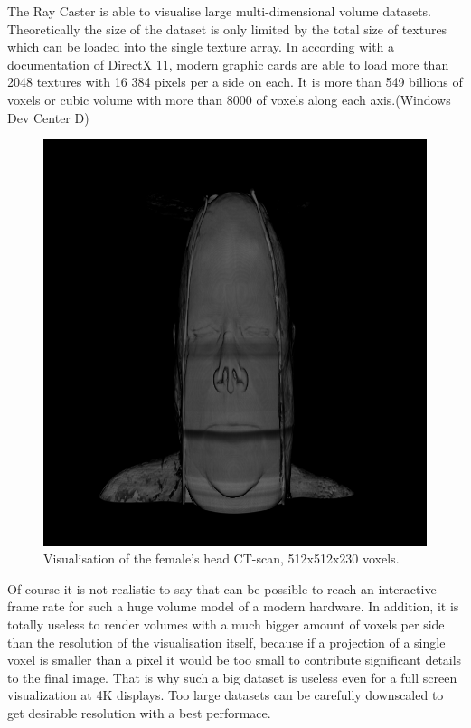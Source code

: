 \documentclass[twoside, english, 11pt]{report}
\begin{document}
The Ray Caster is able to visualise large multi-dimensional volume datasets. Theoretically the size of the dataset is only limited by the total size of textures which can be loaded into the single texture array. In according with a documentation of DirectX 11, modern graphic cards are able to load more than 2048 textures with 16 384 pixels per a side on each. It is more than 549 billions of voxels or cubic volume with more than 8000 of voxels along each axis.(Windows Dev Center D)\\

\begin{figure}[H]
\centerline{\includegraphics[scale = 0.5]{img/head}}
\caption{Visualisation of the female's head CT-scan, 512x512x230 voxels.\label{fig:head}}
\end{figure}

Of course it is not realistic to say that can be possible to reach an interactive frame rate for such a huge volume model of a modern hardware. In addition, it is totally useless to render volumes with a much bigger amount of voxels per side than the resolution of the visualisation itself, because if a projection of a single voxel is smaller than a pixel it would be too small to contribute significant details to the final image. That is why such a big dataset is useless even for a full screen visualization at 4K displays. Too large datasets can be carefully downscaled to get desirable resolution with a best performace.\\\\
\end{document}

